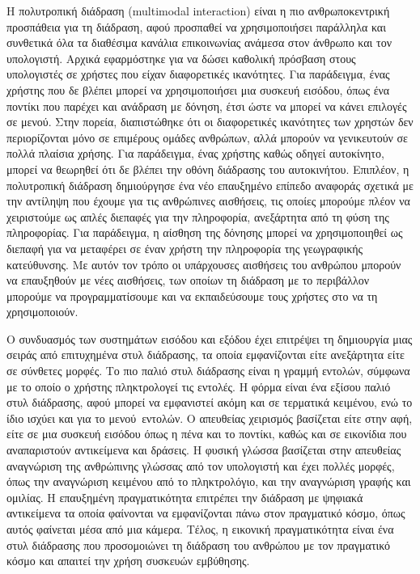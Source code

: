 \documentclass[
]{article}
\begin{document}
Η πολυτροπική διάδραση (multimodal interaction) είναι η πιο
ανθρωποκεντρική προσπάθεια για τη διάδραση, αφού προσπαθεί να
χρησιμοποιήσει παράλληλα και συνθετικά όλα τα διαθέσιμα κανάλια
επικοινωνίας ανάμεσα στον άνθρωπο και τον υπολογιστή. Αρχικά εφαρμόστηκε
για να δώσει καθολική πρόσβαση στους υπολογιστές σε χρήστες που είχαν
διαφορετικές ικανότητες. Για παράδειγμα, ένας χρήστης που δε βλέπει
μπορεί να χρησιμοποιήσει μια συσκευή εισόδου, όπως ένα ποντίκι που
παρέχει και ανάδραση με δόνηση, έτσι ώστε να μπορεί να κάνει επιλογές σε
μενού. Στην πορεία, διαπιστώθηκε ότι οι διαφορετικές ικανότητες των
χρηστών δεν περιορίζονται μόνο σε επιμέρους ομάδες ανθρώπων, αλλά
μπορούν να γενικευτούν σε πολλά πλαίσια χρήσης. Για παράδειγμα, ένας
χρήστης καθώς οδηγεί αυτοκίνητο, μπορεί να θεωρηθεί ότι δε βλέπει την
οθόνη διάδρασης του αυτοκινήτου. Επιπλέον, η πολυτροπική διάδραση
δημιούργησε ένα νέο επαυξημένο επίπεδο αναφοράς σχετικά με την αντίληψη
που έχουμε για τις ανθρώπινες αισθήσεις, τις οποίες μπορούμε πλέον να
χειριστούμε ως απλές διεπαφές για την πληροφορία, ανεξάρτητα από τη φύση
της πληροφορίας. Για παράδειγμα, η αίσθηση της δόνησης μπορεί να
χρησιμοποιηθεί ως διεπαφή για να μεταφέρει σε έναν χρήστη την πληροφορία
της γεωγραφικής κατεύθυνσης. Με αυτόν τον τρόπο οι υπάρχουσες αισθήσεις
του ανθρώπου μπορούν να επαυξηθούν με νέες αισθήσεις, των οποίων τη
διάδραση με το περιβάλλον μπορούμε να προγραμματίσουμε και να
εκπαιδεύσουμε τους χρήστες στο να τη χρησιμοποιούν.

Ο συνδυασμός των συστημάτων εισόδου και εξόδου έχει επιτρέψει τη
δημιουργία μιας σειράς από επιτυχημένα στυλ διάδρασης, τα οποία
εμφανίζονται είτε ανεξάρτητα είτε σε σύνθετες μορφές. Το πιο παλιό στυλ
διάδρασης είναι η γραμμή εντολών, σύμφωνα με το οποίο ο χρήστης
πληκτρολογεί τις εντολές. Η φόρμα είναι ένα εξίσου παλιό στυλ διάδρασης,
αφού μπορεί να εμφανιστεί ακόμη και σε τερματικά κειμένου, ενώ το ίδιο
ισχύει και για το μενού~εντολών. Ο απευθείας χειρισμός βασίζεται είτε
στην αφή, είτε σε μια συσκευή εισόδου όπως η πένα και το ποντίκι, καθώς
και σε εικονίδια που αναπαριστούν αντικείμενα και δράσεις. Η φυσική
γλώσσα βασίζεται στην απευθείας αναγνώριση της ανθρώπινης γλώσσας από
τον υπολογιστή και έχει πολλές μορφές, όπως την αναγνώριση κειμένου από
το πληκτρολόγιο, και την αναγνώριση γραφής και ομιλίας. Η επαυξημένη
πραγματικότητα επιτρέπει την διάδραση με ψηφιακά αντικείμενα τα οποία
φαίνονται να εμφανίζονται πάνω στον πραγματικό κόσμο, όπως αυτός
φαίνεται μέσα από μια κάμερα. Τέλος, η εικονική πραγματικότητα είναι ένα
στυλ διάδρασης που προσομοιώνει τη διάδραση του ανθρώπου με τον
πραγματικό κόσμο και απαιτεί την χρήση συσκευών εμβύθησης.
\end{document}

